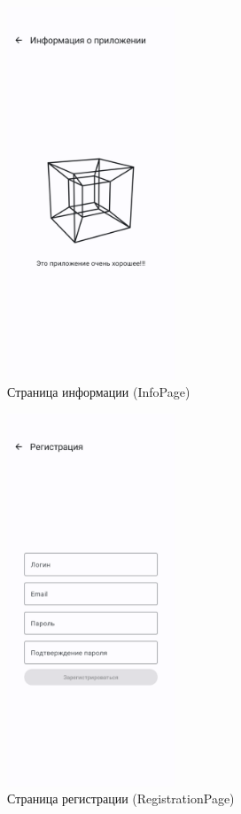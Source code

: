 \documentclass[a4paper, 14pt]{article}
\begin{document}
\begin{figure}[H]
    \centering
    \includegraphics[width=5cm]{resources/5.png}
    \caption{Страница информации (InfoPage)}
\end{figure}

\begin{figure}[H]
    \centering
    \includegraphics[width=5cm]{resources/6.png}
    \caption{Страница регистрации (RegistrationPage)}
\end{figure}
\end{document}
